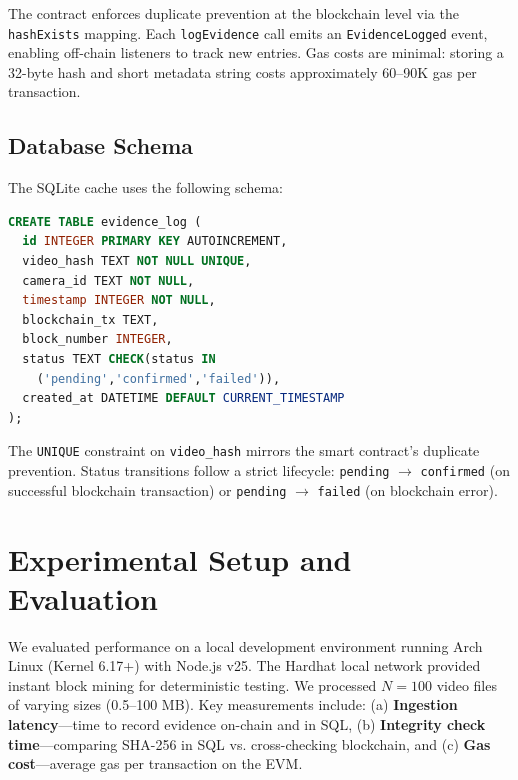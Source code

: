 \documentclass[conference]{IEEEtran}
\begin{document}
The contract enforces duplicate prevention at the blockchain level via the \texttt{hashExists} mapping. Each \texttt{logEvidence} call emits an \texttt{EvidenceLogged} event, enabling off-chain listeners to track new entries. Gas costs are minimal: storing a 32-byte hash and short metadata string costs approximately 60--90K gas per transaction.

\subsection{Database Schema}

The SQLite cache uses the following schema:

\begin{lstlisting}[language=SQL,caption={SQLite evidence\_log table}]
CREATE TABLE evidence_log (
  id INTEGER PRIMARY KEY AUTOINCREMENT,
  video_hash TEXT NOT NULL UNIQUE,
  camera_id TEXT NOT NULL,
  timestamp INTEGER NOT NULL,
  blockchain_tx TEXT,
  block_number INTEGER,
  status TEXT CHECK(status IN
    ('pending','confirmed','failed')),
  created_at DATETIME DEFAULT CURRENT_TIMESTAMP
);
\end{lstlisting}

The \texttt{UNIQUE} constraint on \texttt{video\_hash} mirrors the smart contract's duplicate prevention. Status transitions follow a strict lifecycle: \texttt{pending} $\rightarrow$ \texttt{confirmed} (on successful blockchain transaction) or \texttt{pending} $\rightarrow$ \texttt{failed} (on blockchain error).

\section{Experimental Setup and Evaluation}

We evaluated performance on a local development environment running Arch Linux (Kernel 6.17+) with Node.js v25. The Hardhat local network provided instant block mining for deterministic testing. We processed $N = 100$ video files of varying sizes (0.5--100 MB). Key measurements include: (a) \textbf{Ingestion latency}---time to record evidence on-chain and in SQL, (b) \textbf{Integrity check time}---comparing SHA-256 in SQL vs. cross-checking blockchain, and (c) \textbf{Gas cost}---average gas per transaction on the EVM.
\end{document}
